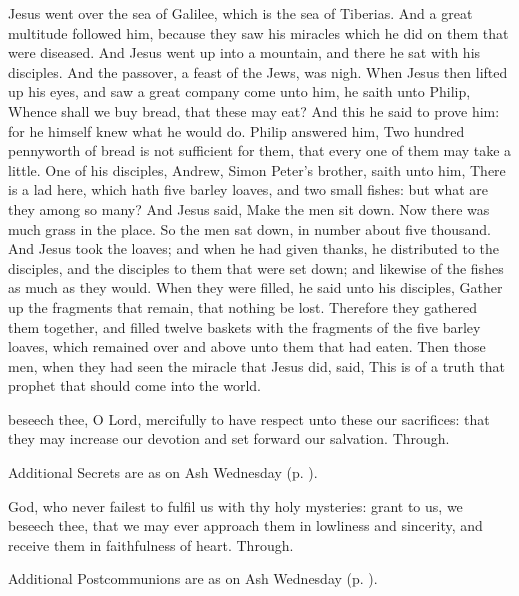 
 Jesus went over the sea of Galilee, which is the sea of Tiberias. And a great multitude followed him, because they saw his miracles which he did on them that were diseased. And Jesus went up into a mountain, and there he sat with his disciples. And the passover, a feast of the Jews, was nigh. When Jesus then lifted up his eyes, and saw a great company come unto him, he saith unto Philip, Whence shall we buy bread, that these may eat? And this he said to prove him: for he himself knew what he would do. Philip answered him, Two hundred pennyworth of bread is not sufficient for them, that every one of them may take a little. One of his disciples, Andrew, Simon Peter's brother, saith unto him, There is a lad here, which hath five barley loaves, and two small fishes: but what are they among so many? And Jesus said, Make the men sit down. Now there was much grass in the place. So the men sat down, in number about five thousand. And Jesus took the loaves; and when he had given thanks, he distributed to the disciples, and the disciples to them that were set down; and likewise of the fishes as much as they would. When they were filled, he said unto his disciples, Gather up the fragments that remain, that nothing be lost. Therefore they gathered them together, and filled twelve baskets with the fragments of the five barley loaves, which remained over and above unto them that had eaten. Then those men, when they had seen the miracle that Jesus did, said, This is of a truth that prophet that should come into the world.

\secret
{} beseech thee, O Lord, mercifully to have respect unto these our sacrifices: that they may increase our devotion and set forward our salvation. Through.
\begin{rubric}
    Additional Secrets are as on Ash Wednesday (p. \pageref{AshWednesdayMassSecret}).
\end{rubric}
\postcommunion
{} God, who never failest to fulfil us with thy holy mysteries: grant to us, we beseech thee, that we may ever approach them in lowliness and sincerity, and receive them in faithfulness of heart. Through.
\begin{rubric}
    Additional Postcommunions are as on Ash Wednesday (p. \pageref{AshWednesdayMassPostcommunion}).
\end{rubric}

